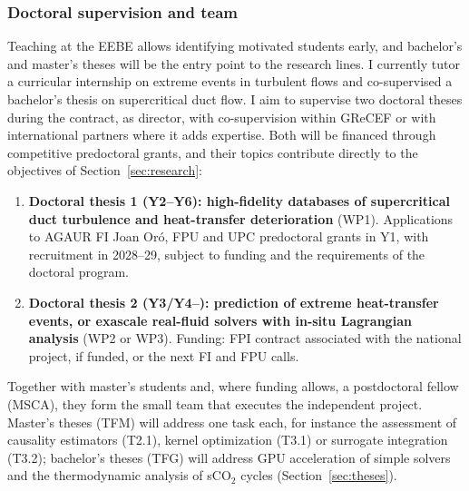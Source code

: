 \documentclass[11pt]{article}
\begin{document}
\subsubsection*{Doctoral supervision and team}
Teaching at the EEBE allows identifying motivated students early, and bachelor's and
master's theses will be the entry point to the research lines. I currently tutor a
curricular internship on extreme events in turbulent flows and co-supervised a bachelor's
thesis on supercritical duct flow. I aim to supervise two doctoral theses during the
contract, as director, with co-supervision within GReCEF or with international partners where
it adds expertise. Both will be financed through competitive predoctoral grants, and their
topics contribute directly to the objectives of Section~\ref{sec:research}:
\begin{enumerate}
  \item \textbf{Doctoral thesis 1 (Y2--Y6): high-fidelity databases of supercritical duct
  turbulence and heat-transfer deterioration} (WP1). Applications to AGAUR FI Joan Or\'o, FPU
  and UPC predoctoral grants in Y1, with recruitment in 2028--29, subject to funding and the
  requirements of the doctoral program.
  \item \textbf{Doctoral thesis 2 (Y3/Y4--): prediction of extreme heat-transfer events, or
  exascale real-fluid solvers with in-situ Lagrangian analysis} (WP2 or WP3). Funding: FPI
  contract associated with the national project, if funded, or the next FI and FPU calls.
\end{enumerate}
Together with master's students and, where funding allows, a postdoctoral fellow (MSCA), they
form the small team that executes the independent project.
Master's theses (TFM) will address one task each, for instance the assessment of causality
estimators (T2.1), kernel optimization (T3.1) or surrogate integration (T3.2); bachelor's
theses (TFG) will address GPU acceleration of simple solvers and the thermodynamic analysis of
sCO$_2$ cycles (Section~\ref{sec:theses}).
\end{document}

